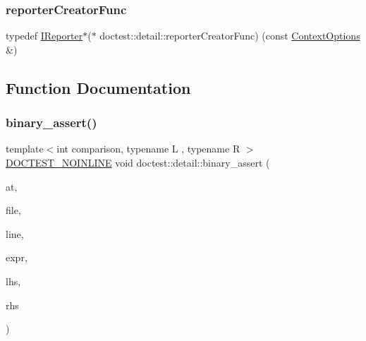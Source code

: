 \mbox{\label{namespacedoctest_1_1detail_a030c0c44c25bdebe6a83858d1f454f72}} 
\subsubsection{\texorpdfstring{reporter\+Creator\+Func}{reporterCreatorFunc}}
{\footnotesize\ttfamily typedef \hyperlink{structdoctest_1_1_i_reporter}{I\+Reporter}$\ast$($\ast$ doctest\+::detail\+::reporter\+Creator\+Func) (const \hyperlink{structdoctest_1_1_context_options}{Context\+Options} \&)}



\subsection{Function Documentation}
\mbox{\label{namespacedoctest_1_1detail_a570279a22ca888528e87a426853a0288}} 
\subsubsection{\texorpdfstring{binary\+\_\+assert()}{binary\_assert()}}
{\footnotesize\ttfamily template$<$int comparison, typename L , typename R $>$ \\
\hyperlink{doctest_8h_a47e9d3609dfcc90b9a630ff33b9524d6}{D\+O\+C\+T\+E\+S\+T\+\_\+\+N\+O\+I\+N\+L\+I\+NE} void doctest\+::detail\+::binary\+\_\+assert (\begin{DoxyParamCaption}\item[{\hyperlink{namespacedoctest_1_1assert_type_ae1bb5bed722f34f1c38b83cb19d326d3}{assert\+Type\+::\+Enum}}]{at,  }\item[{const char $\ast$}]{file,  }\item[{int}]{line,  }\item[{const char $\ast$}]{expr,  }\item[{const \hyperlink{doctest_8h_af2901cafb023c57fb672ccb1bf14f2eb}{D\+O\+C\+T\+E\+S\+T\+\_\+\+R\+E\+F\+\_\+\+W\+R\+AP}(L)}]{lhs,  }\item[{const \hyperlink{doctest_8h_af2901cafb023c57fb672ccb1bf14f2eb}{D\+O\+C\+T\+E\+S\+T\+\_\+\+R\+E\+F\+\_\+\+W\+R\+AP}(R)}]{rhs }\end{DoxyParamCaption})}

